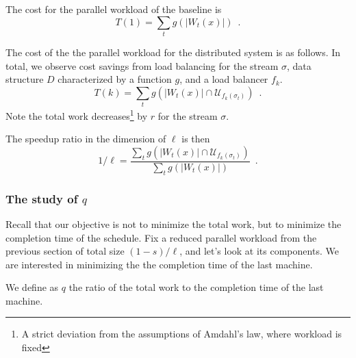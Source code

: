 

The cost for the parallel workload of the baseline is 
\[
	T(1) = \sum_{t} g(|W_t(x)|)\enspace .
\]


The cost of the the parallel workload for the distributed system is as follows.
In total, we observe cost savings from load balancing for the stream $\sigma$, data structure $D$ characterized by a function $g$, and a load balancer $f_k$.
\[
	T(k) = \sum_{t} g(|W_t(x)| \cap \mathcal{U}_{f_k(\sigma_t)}) \enspace .
\]
Note the total work decreases\footnote{A strict deviation from the assumptions of Amdahl's law, where workload is fixed} by $r$ for the stream $\sigma$.

The speedup ratio in the dimension of $\ell$ is then 
\[
	1/\ell = \frac{\sum_{t} g(|W_t(x)| \cap \mathcal{U}_{f_k(\sigma_t)})}{\sum_{t} g(|W_t(x)|)}  \enspace .
\]


\subsubsection{The study of $q$}

Recall that our objective is not to minimize the total work, but to minimize the completion time of the schedule.
Fix a reduced parallel workload from the previous section of total size $(1-s)/\ell$, and let's look at its components.
We are interested in minimizing the the completion time of the last machine. 

We define as $q$ the ratio of the total work to the completion time of the last machine.

